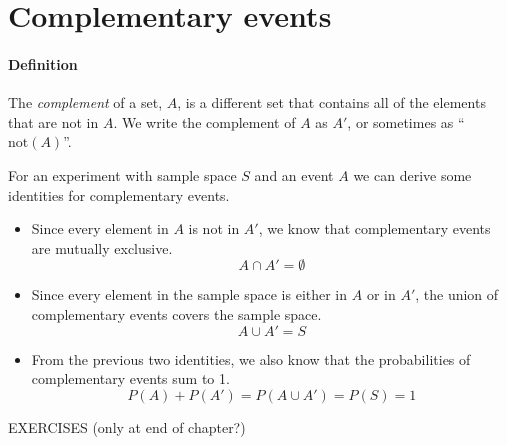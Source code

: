 \documentclass[a4paper,11pt]{report}
\def\complement#1{#1'}
\begin{document}
\section{Complementary events}

\paragraph{Definition} The {\em complement} of a set, $A$, is a
different set that contains all of the elements that are not in
$A$. We write the complement of $A$ as $\complement{A}$, or sometimes
as ``$\textrm{not}(A)$''.

For an experiment with sample space $S$ and an event $A$ we can derive
some identities for complementary events.
\begin{itemize}
\item Since every element in $A$ is not in $\complement{A}$, we know
  that complementary events are mutually exclusive.
  \[A \cap \complement{A} = \emptyset\]
\item Since every element in the sample space is either in $A$ or in
  $\complement{A}$, the union of complementary events covers the
  sample space.
  \[A \cup \complement{A} = S\]
\item From the previous two identities, we also know that the
  probabilities of complementary events sum to 1.
  \[P(A) + P(\complement{A}) = P(A \cup \complement{A}) = P(S) = 1\]
\end{itemize}

EXERCISES (only at end of chapter?)
\end{document}
